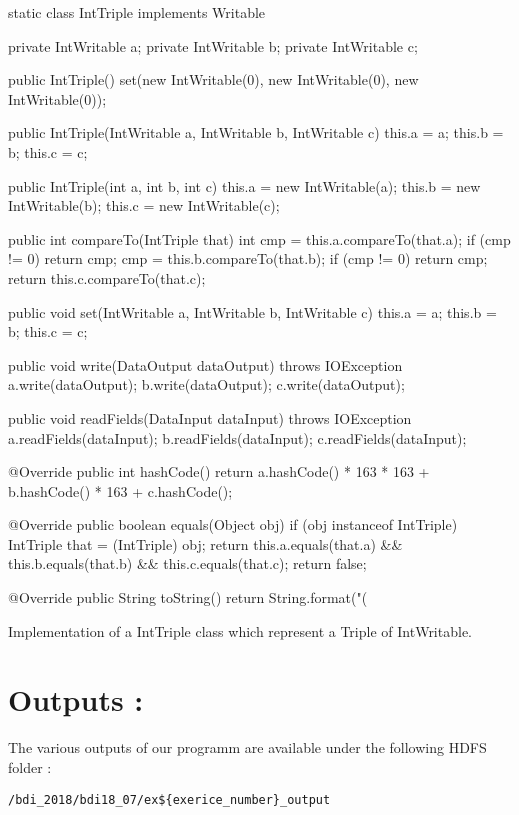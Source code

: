 \documentclass[a4paper,11pt]{report}
\begin{document}
\begin{listing}[h]
\centering
\begin{javacode}
static class IntTriple implements Writable {

    private IntWritable a;
    private IntWritable b;
    private IntWritable c;

    public IntTriple() {
        set(new IntWritable(0), new IntWritable(0), new IntWritable(0));
    }

    public IntTriple(IntWritable a, IntWritable b, IntWritable c) {
        this.a = a;
        this.b = b;
        this.c = c;
    }

    public IntTriple(int a, int b, int c) {
        this.a = new IntWritable(a);
        this.b = new IntWritable(b);
        this.c = new IntWritable(c);
    }

    public int compareTo(IntTriple that) {
        int cmp = this.a.compareTo(that.a);
        if (cmp != 0) return cmp;
        cmp = this.b.compareTo(that.b);
        if (cmp != 0) return cmp;
        return this.c.compareTo(that.c);
    }

    public void set(IntWritable a, IntWritable b, IntWritable c) {
        this.a = a;
        this.b = b;
        this.c = c;
    }

    public void write(DataOutput dataOutput) throws IOException {
        a.write(dataOutput);
        b.write(dataOutput);
        c.write(dataOutput);
    }

    public void readFields(DataInput dataInput) throws IOException {
        a.readFields(dataInput);
        b.readFields(dataInput);
        c.readFields(dataInput);
    }

    @Override
    public int hashCode() {
        return a.hashCode() * 163 * 163 + b.hashCode() * 163 + c.hashCode();
    }

    @Override
    public boolean equals(Object obj) {
        if (obj instanceof IntTriple) {
            IntTriple that = (IntTriple) obj;
            return this.a.equals(that.a) &&
                   this.b.equals(that.b) &&
                   this.c.equals(that.c);
        }
        return false;
    }

    @Override
    public String toString() {
        return String.format("(%
    }
}
\end{javacode}
\caption{Implementation of a IntTriple class which represent a Triple of IntWritable.}
\label{lst:ex5-b}
\end{listing}


\section*{Outputs : }

The various outputs of our programm are available under the following HDFS
folder :
\begin{verbatim}
/bdi_2018/bdi18_07/ex${exerice_number}_output
\end{verbatim}
\end{document}
